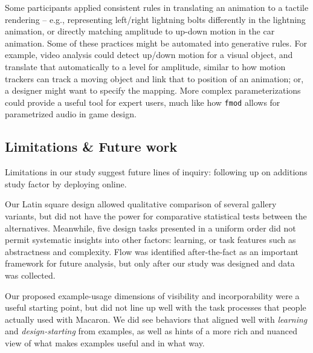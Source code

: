     Some participants applied consistent rules in translating an animation to a tactile rendering -- e.g., representing left/right lightning bolts differently in the lightning animation, or directly matching amplitude to up-down motion in the car animation.
    Some of these practices might be automated into generative rules. 
    For example, video analysis could detect up/down motion for a visual object, and translate that automatically to a level for amplitude, similar to how motion trackers can track a moving object and link that to position of an animation; or, a designer might want to specify the mapping.
    More complex parameterizations could provide a useful tool for expert users, much like how {\tt fmod} allows for parametrized audio in game design.
    
    
\subsection{Limitations \& Future work}
Limitations in our study suggest future lines of inquiry: following up on additions study factor by deploying online.
%
%

%
Our Latin square design allowed qualitative comparison of several gallery variants, but did not have the power for comparative statistical tests between the alternatives.
Meanwhile, five design tasks presented in a uniform order did not permit systematic insights into other factors: learning, or task features such as abstractness and complexity.
Flow was identified after-the-fact as an important framework for future analysis, but only after our study was designed and data was collected.


Our proposed example-usage dimensions of visibility and incorporability were a useful starting point, but did not line up well with the task processes that people actually used with Macaron. We did see behaviors that aligned well with \emph{learning} and \emph{design-starting} from examples, as well as hints of a more  rich and nuanced view of what makes examples useful and in what way.

